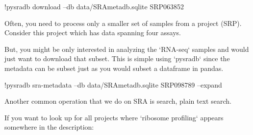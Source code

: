 \documentclass[9pt,a4paper]{extarticle}
\newenvironment{allintypewriter}{\ttfamily}{\par}
\begin{document}
\begin{allintypewriter}
!pysradb download --db data/SRAmetadb.sqlite SRP063852 
\end{allintypewriter}

Often, you need to process only a smaller set of samples from a project (SRP).
Consider this project which has data spanning four assays.


But, you might be only interested in analyzing the `RNA-seq` samples and would 
just want to download that subset. This is simple using `pysradb` since the
metadata can be subset just as you would subset a dataframe in pandas.



\begin{allintypewriter}
!pysradb sra-metadata --db data/SRAmetadb.sqlite  SRP098789 --expand
\end{allintypewriter}


Another common operation that we do on SRA is search, plain text search.


If you want to look up for all projects where `ribosome profiling` appears somewhere
in the description:


\begin{comment}

\section*{Discussion} %
This section is only required if the paper includes novel data or analyses, and 
should be written in the same style as a traditional discussion section. Please 
include a brief discussion of allowances made (if any) for controlling bias or unwanted sources of variability, and the limitations of any novel datasets.


\section*{Conclusions} %
This section is only required if the paper includes novel data or analyses, and should be written as a traditional conclusion.

\section*{Summary} %
This section is required if the paper does not include novel data or analyses.  It allows authors to briefly summarize the key points from the article.


\end{comment}
\end{document}
